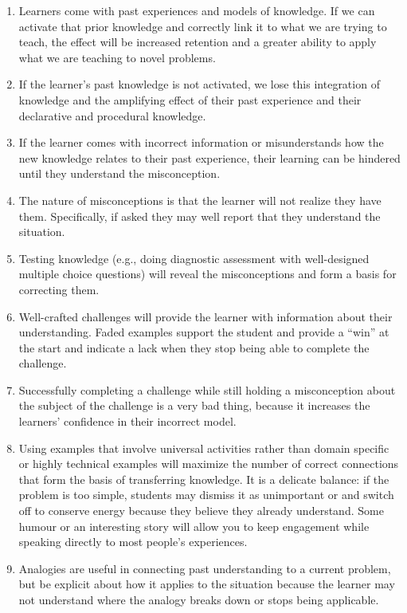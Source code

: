 
\begin{enumerate}
\item
  Learners come with past experiences and models of knowledge. If we can
  activate that prior knowledge and correctly link it to what we are
  trying to teach, the effect will be increased retention and a greater
  ability to apply what we are teaching to novel problems.
\item
  If the learner's past knowledge is not activated, we lose this
  integration of knowledge and the amplifying effect of their past
  experience and their declarative and procedural knowledge.
\item
  If the learner comes with incorrect information or misunderstands how
  the new knowledge relates to their past experience, their learning can
  be hindered until they understand the misconception.
\item
  The nature of misconceptions is that the learner will not realize they
  have them. Specifically, if asked they may well report that they
  understand the situation.
\item
  Testing knowledge (e.g., doing diagnostic assessment with
  well-designed multiple choice questions) will reveal the
  misconceptions and form a basis for correcting them.
\item
  Well-crafted challenges will provide the learner with information
  about their understanding. Faded examples support the student and
  provide a ``win'' at the start and indicate a lack when they stop
  being able to complete the challenge.
\item
  Successfully completing a challenge while still holding a
  misconception about the subject of the challenge is a very bad thing,
  because it increases the learners' confidence in their incorrect
  model.
\item
  Using examples that involve universal activities rather than domain
  specific or highly technical examples will maximize the number of
  correct connections that form the basis of transferring knowledge. It
  is a delicate balance: if the problem is too simple, students may
  dismiss it as unimportant or and switch off to conserve energy because
  they believe they already understand. Some humour or an interesting
  story will allow you to keep engagement while speaking directly to
  most people's experiences.
\item
  Analogies are useful in connecting past understanding to a current
  problem, but be explicit about how it applies to the situation because
  the learner may not understand where the analogy breaks down or stops
  being applicable.
\end{enumerate}


